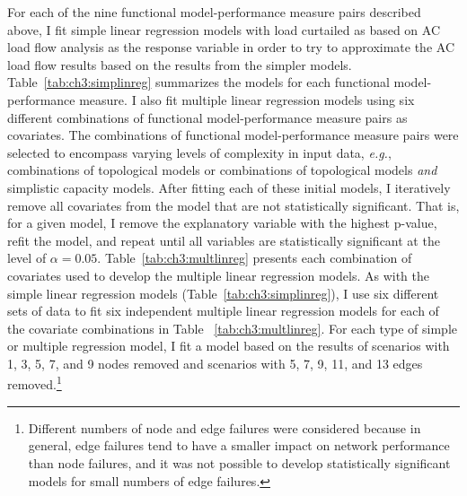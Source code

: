 For each of the nine functional model-performance measure pairs described above, I fit simple linear regression models with load curtailed as based on AC load flow analysis as the response variable in order to try to approximate the AC load flow results based on the results from the simpler models. Table~\ref{tab:ch3:simplinreg} summarizes the models for each functional model-performance measure. I also fit multiple linear regression models using six different combinations of functional model-performance measure pairs as covariates. The combinations of functional model-performance measure pairs were selected to encompass varying levels of complexity in input data, \emph{e.g.}, combinations of topological models or combinations of topological models \emph{and} simplistic capacity models. After fitting each of these initial models, I iteratively remove all covariates from the model that are not statistically significant. That is, for a given model, I remove the explanatory variable with the highest p-value, refit the model, and repeat until all variables are statistically significant at the level of $\alpha = 0.05$.  Table~\ref{tab:ch3:multlinreg} presents each combination of covariates used to develop the multiple linear regression models.  As with the simple linear regression models (Table~\ref{tab:ch3:simplinreg}), I use six different sets of data to fit six independent multiple linear regression models for each of the covariate combinations in Table ~\ref{tab:ch3:multlinreg}.  For each type of simple or multiple regression model, I fit a model based on the results of scenarios with 1, 3, 5, 7, and 9 nodes removed and scenarios with 5, 7, 9, 11, and 13 edges removed.\footnote[8]{Different numbers of node and edge failures were considered because in general, edge failures tend to have a smaller impact on network performance than node failures, and it was not possible to develop statistically significant models for small numbers of edge failures.}
 

